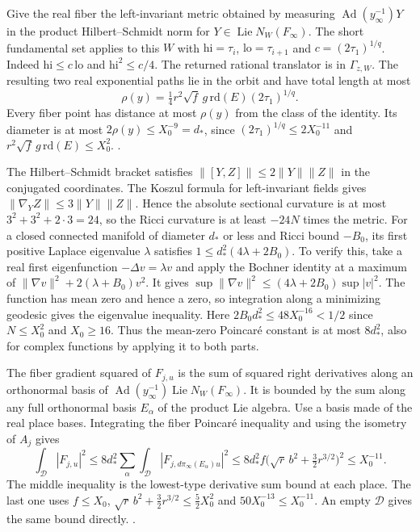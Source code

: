 Give the real fiber the left-invariant metric obtained by measuring
\(\operatorname{Ad}(y_\infty^{-1})Y\) in the product
Hilbert--Schmidt norm for \(Y\in\operatorname{Lie}N_W(F_\infty)\).
The short fundamental set applies to this \(W\) with
\(\mathrm{hi}=\tau_i\), \(\mathrm{lo}=\tau_{i+1}\) and
\(c=(2\tau_1)^{1/q}\). Indeed \(\mathrm{hi}\le c\,\mathrm{lo}\)
and \(\mathrm{hi}^2\le c/4\). The returned rational translator is in
\(\Gamma_{z,W}\). The resulting two real exponential paths lie in the
orbit and have total length at most
\[
 \rho(y)=\tfrac14 r^2\sqrt f\,g\,\mathrm{rd}(E)(2\tau_1)^{1/q}.
\]
Every fiber point has distance at most \(\rho(y)\) from the class of
the identity. Its diameter is at most \(2\rho(y)\le X_0^{-9}=d_*\),
since \((2\tau_1)^{1/q}\le 2X_0^{-11}\) and
\(r^2\sqrt f\,g\,\mathrm{rd}(E)\le X_0^2\).
.

The Hilbert--Schmidt bracket satisfies
\(\|[Y,Z]\|\le2\|Y\|\|Z\|\) in the conjugated coordinates. The Koszul
formula for left-invariant fields gives
\(\|\nabla_Y Z\|\le3\|Y\|\|Z\|\). Hence the absolute sectional
curvature is at most \(3^2+3^2+2\cdot3=24\), so the Ricci curvature
is at least \(-24N\) times the metric. For a closed connected
manifold of diameter \(d_*\) or less and Ricci bound \(-B_0\), its
first positive Laplace eigenvalue \(\lambda\) satisfies
\(1\le d_*^2(4\lambda+2B_0)\). To verify this, take a real first
eigenfunction \(-\Delta v=\lambda v\) and apply the Bochner identity
at a maximum of
\(\|\nabla v\|^2+2(\lambda+B_0)v^2\). It gives
\(\sup\|\nabla v\|^2\le(4\lambda+2B_0)\sup|v|^2\).
The function has mean zero and hence a zero, so integration along a
minimizing geodesic gives the eigenvalue inequality. Here
\(2B_0d_*^2\le48X_0^{-16}<1/2\) since \(N\le X_0^2\) and
\(X_0\ge16\). Thus the mean-zero Poincar\'e constant is at most
\(8d_*^2\), also for complex functions by applying it to both parts.

The fiber gradient squared of \(F_{j,u}\) is the sum of squared
right derivatives along an orthonormal basis of
\(\operatorname{Ad}(y_\infty^{-1})\operatorname{Lie}N_W(F_\infty)\).
It is bounded by the sum along any full orthonormal basis \(E_\alpha\)
of the product Lie algebra. Use a basis made of the real place bases.
Integrating the fiber Poincar\'e inequality and using the isometry of
\(A_j\) gives
\[
 \int_{\mathscr D} |F_{j,u}|^2\le 8d_*^2\sum_\alpha
       \int_{\mathscr D} |F_{j,d\pi_\infty(E_\alpha)u}|^2
 \le 8d_*^2 f\bigl(\sqrt r\,b^2+\tfrac32 r^{3/2}\bigr)^2
 \le X_0^{-11}.
\]
The middle inequality is the lowest-type derivative sum bound at
each place. The last one uses \(f\le X_0\),
\(\sqrt r\,b^2+\tfrac32r^{3/2}\le \tfrac52X_0^2\) and
\(50X_0^{-13}\le X_0^{-11}\). An empty \(\mathscr D\) gives the same bound
directly.
.

